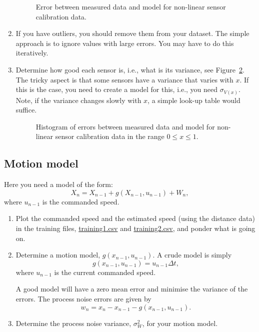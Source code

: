 \documentclass[a4paper, 12]{article}
\newcommand{\var}[1]{\sigma_{#1}^2}
\newcommand{\std}[1]{\sigma_{#1}}
\newcommand{\reffig}[1]{\mbox{Figure~\ref{fig:#1}}}
\begin{document}
\begin{enumerate}
    \begin{figure}[!h]
  \centering
  
  \caption{Error between measured data and model for non-linear sensor
    calibration data.}
  \label{fig:errors}  
  \end{figure}


    
\item If you have outliers, you should remove them from your dataset.
  The simple approach is to ignore values with large errors.  You may
  have to do this iteratively.

\item Determine how good each sensor is, i.e., what is its variance,
  see \reffig{histogram}.  The tricky aspect is that some sensors have
  a variance that varies with $x$.  If this is the case, you need to
  create a model for this, i.e., you need $\std{V(x)}$.  Note, if the
  variance changes slowly with $x$, a simple look-up table would
  suffice.

  \begin{figure}[!h]
  \centering
  
  \caption{Histogram of errors between measured data and model for
    non-linear sensor calibration data in the range $0 \le x \le 1$.}
  \label{fig:histogram}
  \end{figure}
  
\end{enumerate}

  
\subsection{Motion model}

Here you need a model of the form:
%  
\begin{equation}
  X_n = X_{n-1} + g(X_{n-1}, u_{n-1}) + W_n,
\end{equation}
%
where $u_{n-1}$ is the commanded speed.

\begin{enumerate}
\item Plot the commanded speed and the estimated speed (using the
  distance data) in the training files, \url{training1.csv} and
  \url{training2.csv}, and ponder what is going on.

\item Determine a motion model, $g(x_{n-1}, u_{n-1})$.  A crude model
  is simply
  \begin{equation}
    g(x_{n-1}, u_{n-1}) = u_{n-1} \Delta t,
  \end{equation}
  where $u_{n-1}$ is the current commanded speed.
  
  A good model will have a zero mean error and minimise the variance
  of the errors.  The process noise errors are given by
  \begin{equation}
    w_n = x_n - x_{n-1} - g(x_{n-1}, u_{n-1}).
  \end{equation}

\item Determine the process noise variance, $\var{W}$, for your motion model.
  
\end{enumerate}
\end{document}
